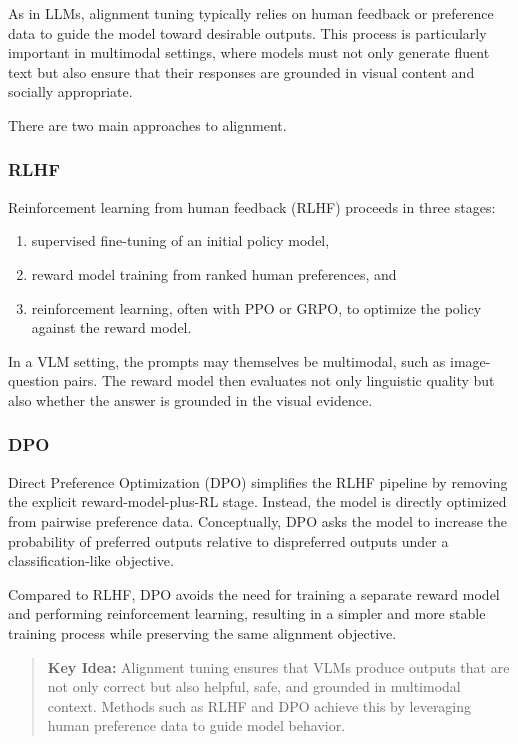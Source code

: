 \documentclass{article}
\newenvironment{keyidea}{\begin{quote}\noindent\textbf{Key Idea:} }{\end{quote}}
\begin{document}
As in LLMs, alignment tuning typically relies on human feedback or preference data to guide the model toward desirable outputs. This process is particularly important in multimodal settings, where models must not only generate fluent text but also ensure that their responses are grounded in visual content and socially appropriate.

There are two main approaches to alignment.

\subsubsection{RLHF}

Reinforcement learning from human feedback (RLHF) proceeds in three stages:
\begin{enumerate}
    \item supervised fine-tuning of an initial policy model,
    \item reward model training from ranked human preferences, and
    \item reinforcement learning, often with PPO or GRPO, to optimize the policy against the reward model.
\end{enumerate}

In a VLM setting, the prompts may themselves be multimodal, such as image-question pairs. The reward model then evaluates not only linguistic quality but also whether the answer is grounded in the visual evidence.

\subsubsection{DPO}

Direct Preference Optimization (DPO) simplifies the RLHF pipeline by removing the explicit reward-model-plus-RL stage. Instead, the model is directly optimized from pairwise preference data. Conceptually, DPO asks the model to increase the probability of preferred outputs relative to dispreferred outputs under a classification-like objective.

Compared to RLHF, DPO avoids the need for training a separate reward model and performing reinforcement learning, resulting in a simpler and more stable training process while preserving the same alignment objective.

\begin{keyidea}
Alignment tuning ensures that VLMs produce outputs that are not only correct but also helpful, safe, and grounded in multimodal context. Methods such as RLHF and DPO achieve this by leveraging human preference data to guide model behavior.
\end{keyidea}
\end{document}
